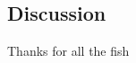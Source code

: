 \documentclass{pnastwo}
\begin{document}
\begin{article}
\section{Discussion}



\begin{acknowledgments}
Thanks for all the fish
\end{acknowledgments}








\end{article}
\end{document}
